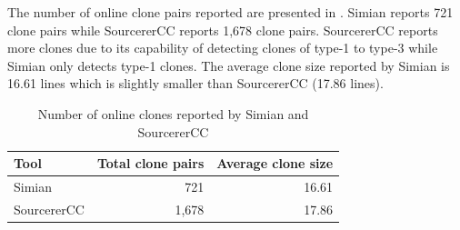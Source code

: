 \documentclass[10pt,journal,compsoc]{IEEEtran}
\begin{document}

The number of online clone pairs reported %
are presented in . Simian reports 721 clone
pairs while SourcererCC reports 1,678 clone pairs. 
SourcererCC reports more clones due to its capability of detecting
clones of type-1 to type-3 while Simian only detects type-1 clones.
The average clone size reported by Simian is
16.61 lines which is slightly smaller than SourcererCC (17.86 lines).

\begin{table}
	\centering
	\caption{Number of online clones reported by Simian and SourcererCC}
	\label{tab:orig_stats}
	\begin{tabular}{lrr}
		\toprule
		Tool & \multicolumn{1}{c}{Total clone pairs} & \multicolumn{1}{c}{Average clone size} \\
		\midrule
		Simian & 721 & 16.61 \\
		SourcererCC & 1,678 & 17.86 \\
		\bottomrule
	\end{tabular} %
\end{table}
\end{document}
